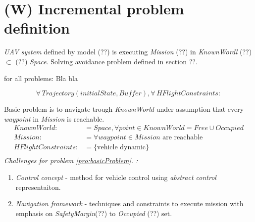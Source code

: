 \section{(W) Incremental problem definition}

\noindent\emph{UAV system} defined by model (??) is executing \emph{Mission} (??) in \emph{KnownWordl} (??) $\subset$ (??) \emph{Space}. Solving avoidance problem defined in section ??.

\begin{constraints}{for all problems:}
    Bla bla
\end{constraints}

\begin{equation}
    \forall \, Trajectory(initialState,Buffer), \forall \, HFlightConstraints:
\end{equation}

\begin{problem}{Basic problem}\label{pro:basicProblem}
    is to navigate trough \emph{KnownWorld} under assumption that every \emph{waypoint} in \emph{Mission} is reachable.
    \begin{equation}\label{eq:basicProblemDefinition}
        \begin{aligned}
            KnownWorld:&= Space, \forall point\in KnownWorld=Free \cup Occupied\\
            Mission:&= \forall waypoint\in Mission \text{ are reachable}\\
            HFlightConstraints:&=\{\text{vehicle dynamic}\}\\
        \end{aligned}
    \end{equation}
    \ifproblemchallenge
    \noindent \emph{Challenges for problem  \ref{pro:basicProblem}. :}
    \begin{enumerate}
        \item \emph{Control concept} -  method for vehicle control using \emph{abstract control} representaiton.
        \item \emph{Navigation framework} - techniques and constraints to execute mission with emphasis on \emph{SafetyMargin}(??) to \emph{Occupied} (??) set.
    \end{enumerate}
    \fi
\end{problem}



